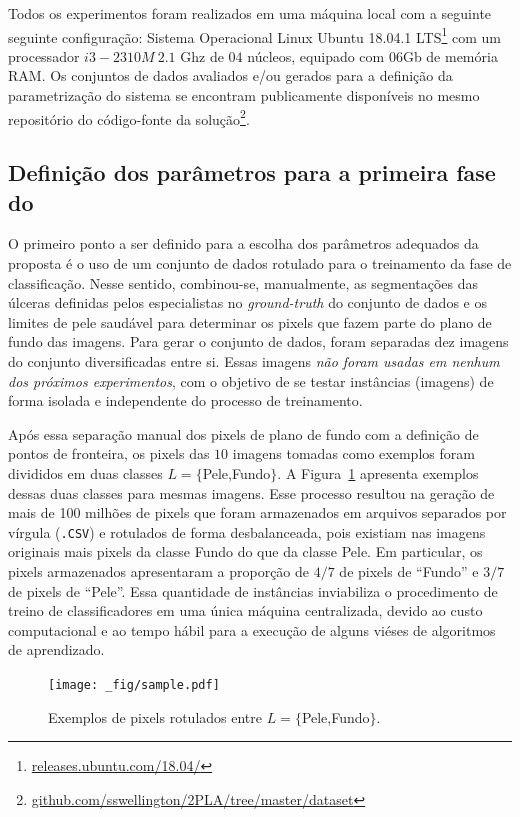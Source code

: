 Todos os experimentos foram realizados em uma máquina local com a seguinte seguinte configuração: Sistema Operacional Linux Ubuntu 18.04.1 LTS\footnote{\url{releases.ubuntu.com/18.04/}} com um processador $i3 - 2310M  ~ 2.1$ Ghz de $04$ núcleos, equipado com 06Gb de memória RAM.
Os conjuntos de dados avaliados e/ou gerados para a definição da parametrização do sistema se encontram publicamente disponíveis no mesmo repositório do código-fonte da solução\footnote{\url{github.com/sswellington/2PLA/tree/master/dataset}}.

\subsection{Definição dos parâmetros para a primeira fase do \system} \label{sec:exp_amostragem}	

O primeiro ponto a ser definido para a escolha dos parâmetros adequados da proposta \system é o uso de um conjunto de dados rotulado para o treinamento da fase de classificação.
Nesse sentido, combinou-se, manualmente, as segmentações das úlceras definidas pelos especialistas no \textit{ground-truth} do conjunto de dados \dataset e os limites de pele saudável para determinar os pixels que fazem parte do plano de fundo das imagens.
Para gerar o conjunto de dados, foram separadas dez imagens do conjunto \dataset diversificadas entre si.
Essas imagens \textit{não foram usadas em nenhum dos próximos experimentos}, com o objetivo de se testar instâncias (imagens) de forma isolada e independente do processo de treinamento.


Após essa separação manual dos pixels de plano de fundo com a definição de pontos de fronteira, os pixels das $10$ imagens tomadas como exemplos foram divididos em duas classes $L= \{$Pele,Fundo$\}$.
A Figura~\ref{fig:sample} apresenta exemplos dessas duas classes para mesmas imagens.
Esse processo resultou na geração de mais de 100 milhões de pixels que foram armazenados em arquivos separados por vírgula (\texttt{.CSV}) e rotulados de forma desbalanceada, pois existiam nas imagens originais mais pixels da classe Fundo do que da classe Pele.
Em particular, os pixels armazenados apresentaram a proporção de $4/7$ de pixels de ``Fundo'' e $3/7$ de pixels de ``Pele''.
Essa quantidade de instâncias inviabiliza o procedimento de treino de classificadores em uma única máquina centralizada, devido ao custo computacional e ao tempo hábil para a execução de alguns viéses de algoritmos de aprendizado. 

\begin{figure}[!htb]
\centering
\texttt{[image: \_fig/sample.pdf]}
\caption[Exemplos de pixels rotulados entre $L= \{$Pele,Fundo$\}$]{Exemplos de pixels rotulados entre $L= \{$Pele,Fundo$\}$.}
\label{fig:sample}
\end{figure}

